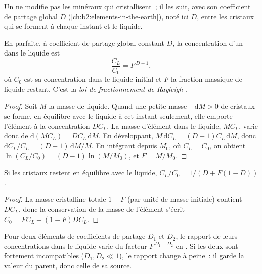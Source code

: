 Un  ne modifie pas les minéraux qui cristallisent~; il les suit,
avec son coefficient de partage global $\bar D$ (\cref{ch:b2:elements-in-the-earth}),
noté ici $D$, entre les cristaux qui se forment à chaque instant et le liquide.

\begin{theorem}\label{thm:b2:magmatic-differentiation:rayleigh}
En  parfaite, à coefficient de partage global constant
$D$, la concentration d'un  dans le liquide est
\[
\frac{C_L}{C_0} = F^{\,D-1},
\]
où $C_0$ est sa concentration dans le liquide initial et $F$ la fraction massique de
liquide restant. C'est la \emph{loi de fractionnement de Rayleigh}
.
\end{theorem}

\begin{proof}
Soit $M$ la masse de liquide. Quand une petite masse $-\mathrm dM > 0$ de cristaux
se forme, en équilibre avec le liquide à cet instant seulement, elle emporte l'élément à la
concentration $DC_L$. La masse d'élément dans le liquide, $MC_L$, varie donc de
$\mathrm d(MC_L) = DC_L\,\mathrm dM$. En développant, $M\,\mathrm dC_L = (D-1)C_L\,
\mathrm dM$, donc $\mathrm dC_L/C_L = (D-1)\,\mathrm dM/M$. En intégrant depuis $M_0$,
où $C_L = C_0$, on obtient $\ln(C_L/C_0) = (D-1)\ln(M/M_0)$, et $F = M/M_0$.
\end{proof}

\begin{proposition}
\label{prop:b2:magmatic-differentiation:equilibrium}
Si les cristaux restent en équilibre avec le liquide, $C_L/C_0 = 1/(D + F(1-D))$.
\end{proposition}

\begin{proof}
La masse cristalline totale $1-F$ (par unité de masse initiale) contient $DC_L$, donc la conservation de la masse de l'élément s'écrit
$C_0 = FC_L + (1-F)DC_L$.
\end{proof}

\begin{corollary}\label{cor:b2:magmatic-differentiation:ratio}
Pour deux éléments de coefficients de partage $D_1$ et $D_2$, le rapport de leurs
concentrations dans le liquide varie du facteur $F^{\,D_1-D_2}$ en . Si les deux sont fortement incompatibles ($D_1, D_2 \ll 1$), le rapport
change à peine~: il garde la valeur du  parent, donc celle de sa source.
\end{corollary}

